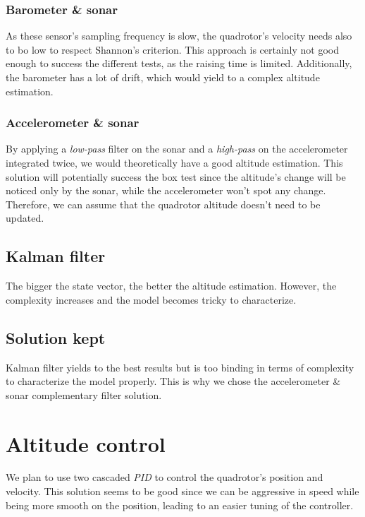 \documentclass{repMobRob}
\begin{document}
\subsubsection{Barometer \& sonar}
As these sensor's sampling frequency is slow, the quadrotor's velocity needs also to bo low to respect Shannon's criterion. This approach is certainly not good enough to success the different tests, as the raising time is limited. Additionally, the barometer has a lot of drift, which would yield to a complex altitude estimation.

\subsubsection{Accelerometer \& sonar}
By applying a \emph{low-pass} filter on the sonar and a \emph{high-pass} on the accelerometer integrated twice, we would theoretically have a good altitude estimation. This solution will potentially success the box test since the altitude's change will be noticed only by the sonar, while the accelerometer won't spot any change. Therefore, we can assume that the quadrotor altitude doesn't need to be updated.

\subsection{Kalman filter}
The bigger the state vector, the better the altitude estimation. However, the complexity increases and the model becomes tricky to characterize. 

\subsection{Solution kept}
Kalman filter yields to the best results but is too binding in terms of complexity to characterize the model properly. This is why we chose the accelerometer \& sonar complementary filter solution. 

\section{Altitude control}
We plan to use two cascaded \emph{PID} to control the quadrotor's position and velocity. This solution seems to be good since we can be aggressive in speed while being more smooth on the position, leading to an easier tuning of the controller.
\end{document}
